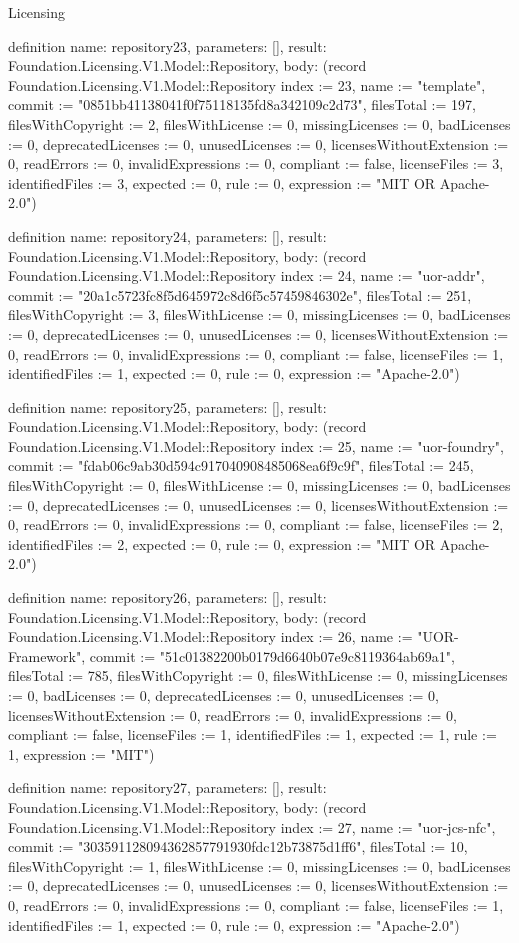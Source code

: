 \begin{lexlean}{Licensing}
\begin{semanticmodule}
definition{
  name: repository23,
  parameters: [],
  result: Foundation.Licensing.V1.Model::Repository,
  body: (record Foundation.Licensing.V1.Model::Repository {index := 23, name := "template", commit := "0851bb41138041f0f75118135fd8a342109c2d73", filesTotal := 197, filesWithCopyright := 2, filesWithLicense := 0, missingLicenses := 0, badLicenses := 0, deprecatedLicenses := 0, unusedLicenses := 0, licensesWithoutExtension := 0, readErrors := 0, invalidExpressions := 0, compliant := false, licenseFiles := 3, identifiedFiles := 3, expected := 0, rule := 0, expression := "MIT OR Apache-2.0"})
}

definition{
  name: repository24,
  parameters: [],
  result: Foundation.Licensing.V1.Model::Repository,
  body: (record Foundation.Licensing.V1.Model::Repository {index := 24, name := "uor-addr", commit := "20a1c5723fc8f5d645972c8d6f5c57459846302e", filesTotal := 251, filesWithCopyright := 3, filesWithLicense := 0, missingLicenses := 0, badLicenses := 0, deprecatedLicenses := 0, unusedLicenses := 0, licensesWithoutExtension := 0, readErrors := 0, invalidExpressions := 0, compliant := false, licenseFiles := 1, identifiedFiles := 1, expected := 0, rule := 0, expression := "Apache-2.0"})
}

definition{
  name: repository25,
  parameters: [],
  result: Foundation.Licensing.V1.Model::Repository,
  body: (record Foundation.Licensing.V1.Model::Repository {index := 25, name := "uor-foundry", commit := "fdab06c9ab30d594c917040908485068ea6f9c9f", filesTotal := 245, filesWithCopyright := 0, filesWithLicense := 0, missingLicenses := 0, badLicenses := 0, deprecatedLicenses := 0, unusedLicenses := 0, licensesWithoutExtension := 0, readErrors := 0, invalidExpressions := 0, compliant := false, licenseFiles := 2, identifiedFiles := 2, expected := 0, rule := 0, expression := "MIT OR Apache-2.0"})
}

definition{
  name: repository26,
  parameters: [],
  result: Foundation.Licensing.V1.Model::Repository,
  body: (record Foundation.Licensing.V1.Model::Repository {index := 26, name := "UOR-Framework", commit := "51c01382200b0179d6640b07e9c8119364ab69a1", filesTotal := 785, filesWithCopyright := 0, filesWithLicense := 0, missingLicenses := 0, badLicenses := 0, deprecatedLicenses := 0, unusedLicenses := 0, licensesWithoutExtension := 0, readErrors := 0, invalidExpressions := 0, compliant := false, licenseFiles := 1, identifiedFiles := 1, expected := 1, rule := 1, expression := "MIT"})
}

definition{
  name: repository27,
  parameters: [],
  result: Foundation.Licensing.V1.Model::Repository,
  body: (record Foundation.Licensing.V1.Model::Repository {index := 27, name := "uor-jcs-nfc", commit := "303591128094362857791930fdc12b73875d1ff6", filesTotal := 10, filesWithCopyright := 1, filesWithLicense := 0, missingLicenses := 0, badLicenses := 0, deprecatedLicenses := 0, unusedLicenses := 0, licensesWithoutExtension := 0, readErrors := 0, invalidExpressions := 0, compliant := false, licenseFiles := 1, identifiedFiles := 1, expected := 0, rule := 0, expression := "Apache-2.0"})
}


\end{semanticmodule}
\end{lexlean}
